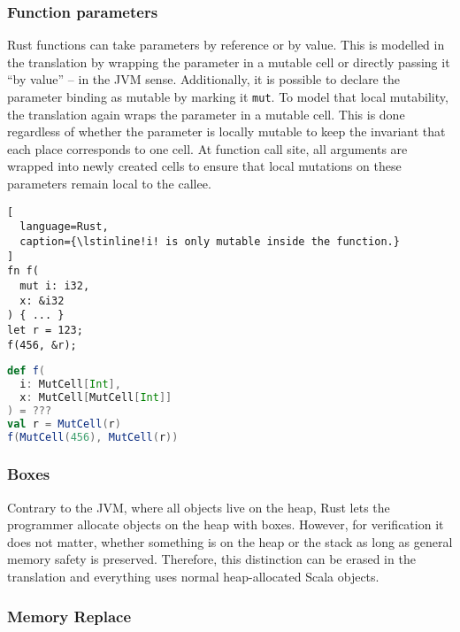 \subsubsection{Function parameters}

Rust functions can take parameters by reference or by value. This is modelled in
the translation by wrapping the parameter in a mutable cell or directly passing
it ``by value'' -- in the JVM sense. Additionally, it is possible to declare the
parameter binding as mutable by marking it \passthrough{\lstinline!mut!}. To
model that local mutability, the translation again wraps the parameter in a
mutable cell. This is done regardless of whether the parameter is locally
mutable to keep the invariant that each place corresponds to one cell. At
function call site, all arguments are wrapped into newly created cells to ensure
that local mutations on these parameters remain local to the callee.

\noindent\begin{minipage}[t]{.48\textwidth}
\begin{lstlisting}[
  language=Rust,
  caption={\lstinline!i! is only mutable inside the function.}
]
fn f(
  mut i: i32,
  x: &i32
) { ... }
let r = 123;
f(456, &r);
\end{lstlisting}
\end{minipage}\hfill
\begin{minipage}[t]{.48\textwidth}
\begin{lstlisting}[language=Scala, caption={This results in nested cell in Scala.}]
def f(
  i: MutCell[Int],
  x: MutCell[MutCell[Int]]
) = ???
val r = MutCell(r)
f(MutCell(456), MutCell(r))
\end{lstlisting}
\end{minipage}

\subsubsection{Boxes}

Contrary to the JVM, where all objects live on the heap, Rust lets the
programmer allocate objects on the heap with boxes. However, for verification it
does not matter, whether something is on the heap or the stack as long as
general memory safety is preserved. Therefore, this distinction can be erased in
the translation and everything uses normal heap-allocated Scala objects.

\subsubsection{Memory Replace}

